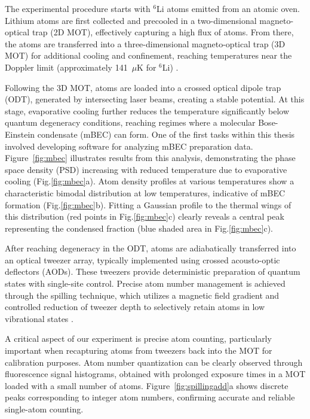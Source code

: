The experimental procedure starts with $^6$Li atoms emitted from an atomic oven. Lithium atoms are first collected and precooled in a two-dimensional magneto-optical trap (2D MOT), effectively capturing a high flux of atoms. From there, the atoms are transferred into a three-dimensional magneto-optical trap (3D MOT) for additional cooling and confinement, reaching temperatures near the Doppler limit (approximately 141~$\mu$K for $^6$Li) \cite{culemann_construction_2024, huang_construction_2024}.

Following the 3D MOT, atoms are loaded into a crossed optical dipole trap (ODT), generated by intersecting laser beams, creating a stable potential. At this stage, evaporative cooling further reduces the temperature significantly below quantum degeneracy conditions, reaching regimes where a molecular Bose-Einstein condensate (mBEC) can form. One of the first tasks within this thesis involved developing software for analyzing mBEC preparation data. Figure~\ref{fig:mbec} illustrates results from this analysis, demonstrating the phase space density (PSD) increasing with reduced temperature due to evaporative cooling (Fig.\ref{fig:mbec}a). Atom density profiles at various temperatures show a characteristic bimodal distribution at low temperatures, indicative of mBEC formation (Fig.\ref{fig:mbec}b). Fitting a Gaussian profile to the thermal wings of this distribution (red points in Fig.\ref{fig:mbec}c) clearly reveals a central peak representing the condensed fraction (blue shaded area in Fig.\ref{fig:mbec}c).

After reaching degeneracy in the ODT, atoms are adiabatically transferred into an optical tweezer array, typically implemented using crossed acousto-optic deflectors (AODs). These tweezers provide deterministic preparation of quantum states with single-site control. Precise atom number management is achieved through the spilling technique, which utilizes a magnetic field gradient and controlled reduction of tweezer depth to selectively retain atoms in low vibrational states \cite{culemann_construction_2024, huang_construction_2024}.

A critical aspect of our experiment is precise atom counting, particularly important when recapturing atoms from tweezers back into the MOT for calibration purposes. Atom number quantization can be clearly observed through fluorescence signal histograms, obtained with prolonged exposure times in a MOT loaded with a small number of atoms. Figure~\ref{fig:spillingadd}a shows discrete peaks corresponding to integer atom numbers, confirming accurate and reliable single-atom counting. 

